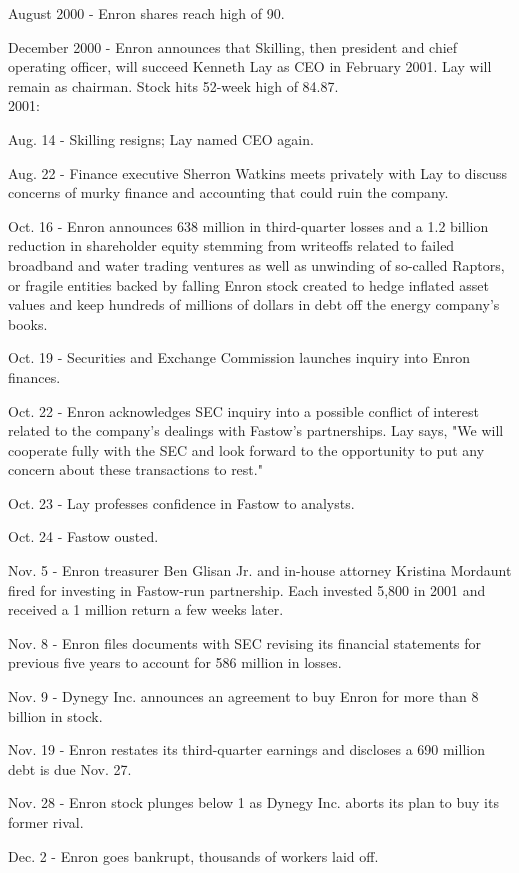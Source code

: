 \documentclass[12pt]{article}
\begin{document}
August 2000 - Enron shares reach high of 90.

December 2000 - Enron announces that Skilling, then president and chief operating officer, will succeed Kenneth Lay as CEO in February 2001. Lay will remain as chairman. Stock hits 52-week high of 84.87. \\

2001:

Aug. 14 - Skilling resigns; Lay named CEO again.

Aug. 22 - Finance executive Sherron Watkins meets privately with Lay to discuss concerns of murky finance and accounting that could ruin the company.

Oct. 16 - Enron announces 638 million in third-quarter losses and a 1.2 billion reduction in shareholder equity stemming from writeoffs related to failed broadband and water trading ventures as well as unwinding of so-called Raptors, or fragile entities backed by falling Enron stock created to hedge inflated asset values and keep hundreds of millions of dollars in debt off the energy company's books.

Oct. 19 - Securities and Exchange Commission launches inquiry into Enron finances.

Oct. 22 - Enron acknowledges SEC inquiry into a possible conflict of interest related to the company's dealings with Fastow's partnerships. Lay says, "We will cooperate fully with the SEC and look forward to the opportunity to put any concern about these transactions to rest."

Oct. 23 - Lay professes confidence in Fastow to analysts.

Oct. 24 - Fastow ousted.

Nov. 5 - Enron treasurer Ben Glisan Jr. and in-house attorney Kristina Mordaunt fired for investing in Fastow-run partnership. Each invested 5,800 in 2001 and received a 1 million return a few weeks later.

Nov. 8 - Enron files documents with SEC revising its financial statements for previous five years to account for 586 million in losses.

Nov. 9 - Dynegy Inc. announces an agreement to buy Enron for more than 8 billion in stock.

Nov. 19 - Enron restates its third-quarter earnings and discloses a 690 million debt is due Nov. 27.

Nov. 28 - Enron stock plunges below 1 as Dynegy Inc. aborts its plan to buy its former rival.

Dec. 2 - Enron goes bankrupt, thousands of workers laid off.
	
\end{document}

